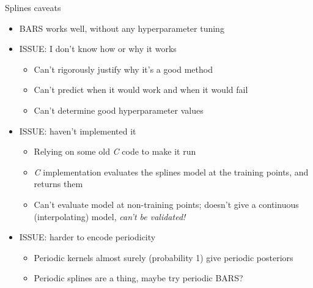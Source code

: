 \documentclass[presentation]{beamer}
\begin{document}
\begin{frame}[label={sec:org0a0d345}]{Splines caveats}
\begin{itemize}[<+->]
\item BARS works well, without any hyperparameter tuning
\item ISSUE: I don't know how or why it works
\begin{itemize}
\item Can't rigorously justify why it's a good method
\item Can't predict when it would work and when it would fail
\item Can't determine good hyperparameter values
\end{itemize}
\item ISSUE: haven't implemented it
\begin{itemize}
\item Relying on some old \emph{C} code to make it run
\item \emph{C} implementation evaluates the splines model at the training points, and returns them
\item Can't evaluate model at non-training points; doesn't give a continuous (interpolating) model, \emph{can't be validated!}
\end{itemize}
\item ISSUE: harder to encode periodicity
\begin{itemize}
\item Periodic kernels almost surely (probability 1) give periodic posteriors
\item Periodic splines are a thing, maybe try periodic BARS?
\end{itemize}
\end{itemize}
\end{frame}
\end{document}
